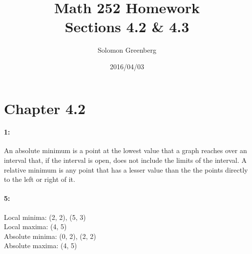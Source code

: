 \documentclass[12pt]{article}
\title{Math 252 Homework\\
\large Sections 4.2 \& 4.3}
\date{2016/04/03}
\author{Solomon Greenberg}
\begin{document}
    \newpage

    \section*{Chapter 4.2}
    \paragraph*{1:\\}
        An absolute minimum is a point at the lowest value that a graph reaches over an interval that, if the interval is open, does not include the limits of the interval. A relative minimum is any point that has a lesser value than the the points directly to the left or right of it.

    \paragraph*{5:\\}
        Local minima: (2, 2), (5, 3) \\
        Local maxima: (4, 5) \\
        Absolute minima: (0, 2), (2, 2) \\
        Absolute maxima: (4, 5) \\
\end{document}

